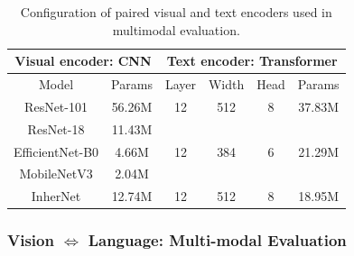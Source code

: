 \documentclass{article} %
\begin{document}
\begin{table}[t]
\centering
\caption{Configuration of paired visual and text encoders used in multimodal evaluation.}
\vspace{-0.3cm}
\begin{tabular}{@{}cc|cccc@{}}
\toprule[1.2pt]
\multicolumn{2}{c|}{Visual encoder: CNN}                           & \multicolumn{4}{c}{Text encoder: Transformer}                                                                                                            \\ \midrule
\multicolumn{1}{c|}{Model}           & \multicolumn{1}{l|}{Params} & \multicolumn{1}{c|}{Layer}               & \multicolumn{1}{c|}{Width}                & \multicolumn{1}{c|}{Head}               & Params                  \\ \midrule
\multicolumn{1}{c|}{ResNet-101}      & 56.26M                      & \multicolumn{1}{c|}{12}                  & \multicolumn{1}{c|}{512}                  & \multicolumn{1}{c|}{8}                  & 37.83M                  \\ \midrule
\multicolumn{1}{c|}{ResNet-18}       & 11.43M                      & \multicolumn{1}{c|}{\multirow{3}{*}{12}} & \multicolumn{1}{c|}{\multirow{3}{*}{384}} & \multicolumn{1}{c|}{\multirow{3}{*}{6}} & \multirow{3}{*}{21.29M} \\
\multicolumn{1}{c|}{EfficientNet-B0} & 4.66M                       & \multicolumn{1}{c|}{}                    & \multicolumn{1}{c|}{}                     & \multicolumn{1}{c|}{}                   &                         \\
\multicolumn{1}{c|}{MobileNetV3}     & 2.04M                       & \multicolumn{1}{c|}{}                    & \multicolumn{1}{c|}{}                     & \multicolumn{1}{c|}{}                   &                         \\ \midrule
\multicolumn{1}{c|}{InherNet}        & 12.74M                      & \multicolumn{1}{c|}{12}                  & \multicolumn{1}{c|}{512}                  & \multicolumn{1}{c|}{8}                  & 18.95M                  \\ \bottomrule[1.2pt]
\end{tabular}%
\label{tab:conf}
\end{table}

\subsubsection{Vision $\Leftrightarrow$ Language: Multi-modal Evaluation}
\end{document}
